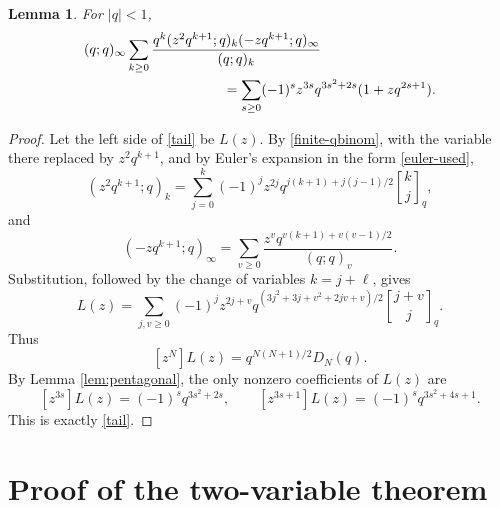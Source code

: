 \documentclass[11pt]{amsart}
\newtheorem{lemma}{Lemma}
\theoremstyle{remark}
\newcommand{\qbinom}[3][]{\genfrac{[}{]}{0pt}{}{#2}{#3}_{#1}}
\begin{document}
\begin{lemma}\label{lem:tail}
For $|q|<1$,
\begin{equation}\label{tail}
\begin{aligned}
&(q;q)_\infty
\sum_{k\ge0}
\frac{q^k(z^2q^{k+1};q)_k(-zq^{k+1};q)_\infty}{(q;q)_k} \\
&\hspace{35mm}=
\sum_{s\ge0}(-1)^sz^{3s}q^{3s^2+2s}(1+zq^{2s+1}).
\end{aligned}
\end{equation}
\end{lemma}

\begin{proof}
Let the left side of \eqref{tail} be $L(z)$.  By \eqref{finite-qbinom}, with the variable there replaced by $z^2q^{k+1}$, and by Euler's expansion in the form \eqref{euler-used},
\[
(z^2q^{k+1};q)_k
=
\sum_{j=0}^k(-1)^jz^{2j}q^{j(k+1)+j(j-1)/2}\qbinom[q]{k}{j},
\]
and
\[
(-zq^{k+1};q)_\infty
=
\sum_{v\ge0}\frac{z^vq^{v(k+1)+v(v-1)/2}}{(q;q)_v}.
\]
Substitution, followed by the change of variables $k=j+\ell$, gives
\[
L(z)=
\sum_{j,v\ge0}(-1)^jz^{2j+v}
q^{(3j^2+3j+v^2+2jv+v)/2}
\qbinom[q]{j+v}{j}.
\]
Thus
\begin{equation}\label{coeff-L}
[z^N]L(z)=q^{N(N+1)/2}D_N(q).
\end{equation}
By Lemma \ref{lem:pentagonal}, the only nonzero coefficients of $L(z)$ are
\[
[z^{3s}]L(z)=(-1)^sq^{3s^2+2s},
\qquad
[z^{3s+1}]L(z)=(-1)^sq^{3s^2+4s+1}.
\]
This is exactly \eqref{tail}.
\end{proof}

\section{Proof of the two-variable theorem}
\end{document}
